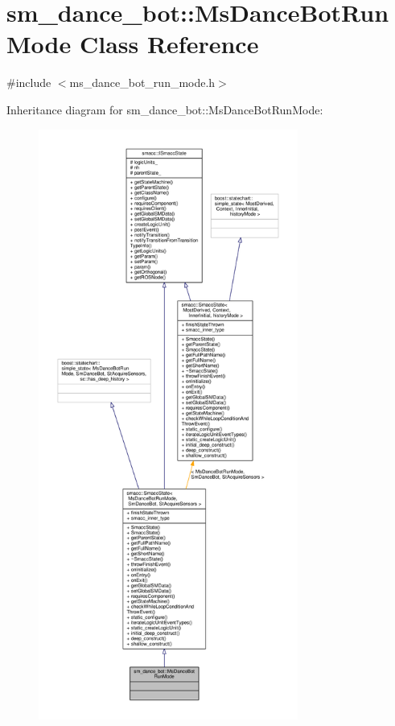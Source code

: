\hypertarget{classsm__dance__bot_1_1MsDanceBotRunMode}{}\section{sm\+\_\+dance\+\_\+bot\+:\+:Ms\+Dance\+Bot\+Run\+Mode Class Reference}
\label{classsm__dance__bot_1_1MsDanceBotRunMode}


{\ttfamily \#include $<$ms\+\_\+dance\+\_\+bot\+\_\+run\+\_\+mode.\+h$>$}



Inheritance diagram for sm\+\_\+dance\+\_\+bot\+:\+:Ms\+Dance\+Bot\+Run\+Mode\+:\nopagebreak
\begin{figure}[H]
\begin{center}
\leavevmode
\includegraphics[height=550pt]{classsm__dance__bot_1_1MsDanceBotRunMode__inherit__graph}
\end{center}
\end{figure}


